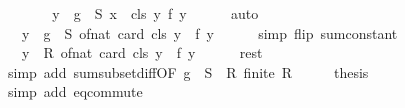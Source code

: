 \begin{isabellebody}
\ \ \isamarkupfalse%
\ \isamarkupfalse%
\ {\isachardoublequoteopen}{\isachardot}{\kern0pt}{\isachardot}{\kern0pt}{\isachardot}{\kern0pt}\ {\isacharequal}{\kern0pt}\ {\isacharparenleft}{\kern0pt}{\isasymSum}y\ {\isasymin}\ g\ {\isacharbackquote}{\kern0pt}\ S{\isachardot}{\kern0pt}\ {\isasymSum}x\ {\isasymin}\ {\isacharquery}{\kern0pt}cls\ y{\isachardot}{\kern0pt}\ f\ y{\isacharparenright}{\kern0pt}{\isachardoublequoteclose}\isanewline
\ \ \ \ \isamarkupfalse%
\ auto\isanewline
\ \ \isamarkupfalse%
\ \isamarkupfalse%
\ {\isachardoublequoteopen}{\isachardot}{\kern0pt}{\isachardot}{\kern0pt}{\isachardot}{\kern0pt}\ {\isacharequal}{\kern0pt}\ {\isacharparenleft}{\kern0pt}{\isasymSum}y\ {\isasymin}\ g\ {\isacharbackquote}{\kern0pt}\ S{\isachardot}{\kern0pt}\ of{\isacharunderscore}{\kern0pt}nat\ {\isacharparenleft}{\kern0pt}card\ {\isacharparenleft}{\kern0pt}{\isacharquery}{\kern0pt}cls\ y{\isacharparenright}{\kern0pt}{\isacharparenright}{\kern0pt}\ {\isacharasterisk}{\kern0pt}\ f\ y{\isacharparenright}{\kern0pt}{\isachardoublequoteclose}\isanewline
\ \ \ \ \isamarkupfalse%
\ {\isacharparenleft}{\kern0pt}simp\ flip{\isacharcolon}{\kern0pt}\ sum{\isacharunderscore}{\kern0pt}constant{\isacharparenright}{\kern0pt}\isanewline
\ \ \isamarkupfalse%
\ \isamarkupfalse%
\ {\isachardoublequoteopen}{\isachardot}{\kern0pt}{\isachardot}{\kern0pt}{\isachardot}{\kern0pt}\ {\isacharequal}{\kern0pt}\ {\isacharparenleft}{\kern0pt}{\isasymSum}y\ {\isasymin}\ R{\isachardot}{\kern0pt}\ of{\isacharunderscore}{\kern0pt}nat\ {\isacharparenleft}{\kern0pt}card\ {\isacharparenleft}{\kern0pt}{\isacharquery}{\kern0pt}cls\ y{\isacharparenright}{\kern0pt}{\isacharparenright}{\kern0pt}\ {\isacharasterisk}{\kern0pt}\ f\ y{\isacharparenright}{\kern0pt}{\isachardoublequoteclose}\isanewline
\ \ \ \ \isamarkupfalse%
\ rest{\isacharunderscore}{\kern0pt}{}\ \isamarkupfalse%
\ {\isacharparenleft}{\kern0pt}simp\ add{\isacharcolon}{\kern0pt}\ sum{\isachardot}{\kern0pt}subset{\isacharunderscore}{\kern0pt}diff{\isacharbrackleft}{\kern0pt}OF\ {\isacartoucheopen}g\ {\isacharbackquote}{\kern0pt}\ S\ {\isasymsubseteq}\ R{\isacartoucheclose}\ {\isacartoucheopen}finite\ R{\isacartoucheclose}{\isacharbrackright}{\kern0pt}{\isacharparenright}{\kern0pt}\isanewline
\ \ \isamarkupfalse%
\ \isamarkupfalse%
\ {\isacharquery}{\kern0pt}thesis\isanewline
\ \ \ \ \isamarkupfalse%
\ {\isacharparenleft}{\kern0pt}simp\ add{\isacharcolon}{\kern0pt}\ eq{\isacharunderscore}{\kern0pt}commute{\isacharparenright}{\kern0pt}\isanewline

\end{isabellebody}
